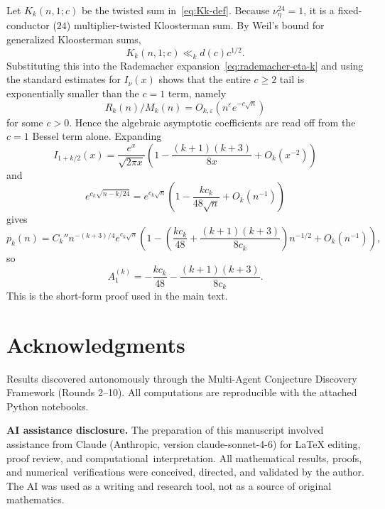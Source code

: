 \documentclass[11pt,a4paper]{article}
\begin{document}
Let $K_k(n,1;c)$ be the twisted sum in~\eqref{eq:Kk-def}. Because $\nu_{\eta}^{24}=1$, it is a fixed-conductor ($24$) multiplier-twisted Kloosterman sum. By Weil's bound for generalized Kloosterman sums,
\[
  K_k(n,1;c)\ll_k d(c)c^{1/2}.
\]
Substituting this into the Rademacher expansion~\eqref{eq:rademacher-eta-k} and using the standard estimates for $I_{\nu}(x)$ shows that the entire $c\ge2$ tail is exponentially smaller than the $c=1$ term, namely
\[
  R_k(n)/M_k(n)=O_{k,\varepsilon}(n^{\varepsilon}e^{-c\sqrt n})
\]
for some $c>0$. Hence the algebraic asymptotic coefficients are read off from the $c=1$ Bessel term alone. Expanding
\[
  I_{1+k/2}(x)=\frac{e^x}{\sqrt{2\pi x}}\left(1-\frac{(k+1)(k+3)}{8x}+O_k(x^{-2})\right)
\]
and
\[
  e^{c_k\sqrt{n-k/24}}=e^{c_k\sqrt n}\left(1-\frac{k c_k}{48\sqrt n}+O_k(n^{-1})\right)
\]
gives
\[
  p_k(n)=C_k''n^{-(k+3)/4}e^{c_k\sqrt n}
  \left(1-
    \left(\frac{k c_k}{48}+\frac{(k+1)(k+3)}{8c_k}\right)n^{-1/2}
    +O_k(n^{-1})
  \right),
\]
so
\[
  A_1^{(k)}=-\frac{k c_k}{48}-\frac{(k+1)(k+3)}{8c_k}.
\]
This is the short-form proof used in the main text.

\section*{Acknowledgments}

Results discovered autonomously through the Multi-Agent Conjecture Discovery Framework (Rounds 2--10). All computations are reproducible with the attached Python notebooks.

\medskip
\noindent\textbf{AI assistance disclosure.} The preparation of this manuscript involved assistance from Claude (Anthropic, version claude-sonnet-4-6) for LaTeX editing, proof review, and computational~interpretation. All mathematical results, proofs, and numerical~verifications were conceived, directed, and validated by the author. The AI was used as a writing and research tool, not as a source of original mathematics.
\end{document}
